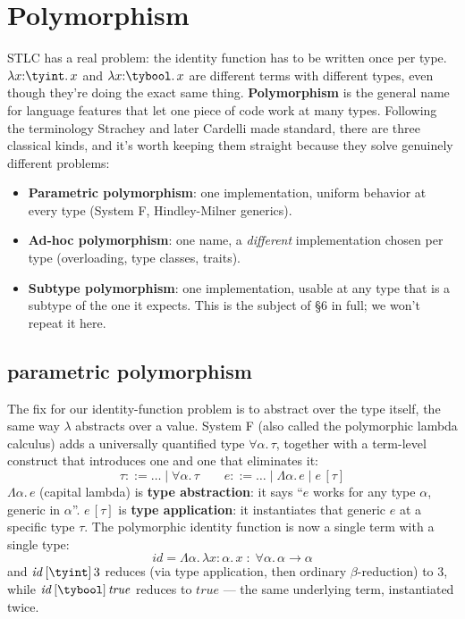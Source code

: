 \section{Polymorphism}

STLC has a real problem: the identity function has to be written once per type. $\lambda x{:}\tyint.\,x$ and $\lambda x{:}\tybool.\,x$ are different terms with different types, even though they're doing the exact same thing. \textbf{Polymorphism} is the general name for language features that let one piece of code work at many types. Following the terminology Strachey and later Cardelli made standard, there are three classical kinds, and it's worth keeping them straight because they solve genuinely different problems:

\begin{itemize}
  \item \textbf{Parametric polymorphism}: one implementation, uniform behavior at every type (System F, Hindley-Milner generics).
  \item \textbf{Ad-hoc polymorphism}: one name, a \emph{different} implementation chosen per type (overloading, type classes, traits).
  \item \textbf{Subtype polymorphism}: one implementation, usable at any type that is a subtype of the one it expects. This is the subject of \S6 in full; we won't repeat it here.
\end{itemize}

\subsection{parametric polymorphism}

The fix for our identity-function problem is to abstract over the type itself, the same way $\lambda$ abstracts over a value. System F (also called the polymorphic lambda calculus) adds a universally quantified type $\forall \alpha.\, \tau$, together with a term-level construct that introduces one and one that eliminates it:
\[
  \tau ::= \dots \mid \forall \alpha.\, \tau
  \qquad
  e ::= \dots \mid \Lambda \alpha.\, e \mid e\,[\tau]
\]
$\Lambda \alpha.\, e$ (capital lambda) is \textbf{type abstraction}: it says ``$e$ works for any type $\alpha$, generic in $\alpha$''. $e\,[\tau]$ is \textbf{type application}: it instantiates that generic $e$ at a specific type $\tau$. The polymorphic identity function is now a single term with a single type:
\[
  \mathit{id} = \Lambda \alpha.\, \lambda x{:}\alpha.\, x \;:\; \forall \alpha.\, \alpha \to \alpha
\]
and $\mathit{id}\,[\tyint]\,3$ reduces (via type application, then ordinary $\beta$-reduction) to $3$, while $\mathit{id}\,[\tybool]\,\mathit{true}$ reduces to $\mathit{true}$ — the same underlying term, instantiated twice.


